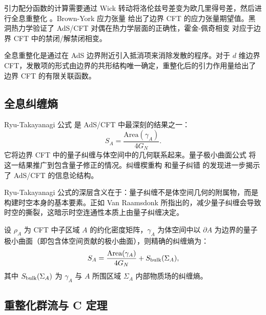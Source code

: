 引力配分函数的计算需要通过 Wick 转动将洛伦兹号差变为欧几里得号差，然后进行全息重整化 \cite{Henningson1998, Balasubramanian1999}。Brown-York 应力张量 \cite{Brown1993} 给出了边界 CFT 的应力张量期望值。黑洞热力学验证了 AdS/CFT 对偶在热力学层面的正确性，霍金-佩奇相变 \cite{Hawking1983} 对应于边界 CFT 中的禁闭/解禁闭相变。

\begin{definition}[全息重整化]
全息重整化是通过在 AdS 边界附近引入抵消项来消除发散的程序。对于 $d$ 维边界 CFT，发散项的形式由边界的共形结构唯一确定，重整化后的引力作用量给出了边界 CFT 的有限关联函数。
\end{definition}

\subsection{全息纠缠熵}

Ryu-Takayanagi 公式 \cite{Ryu2006} 是 AdS/CFT 中最深刻的结果之一：
\begin{equation}
    S_A = \frac{\text{Area}(\gamma_A)}{4G_N}.
\end{equation}
它将边界 CFT 中的量子纠缠与体空间中的几何联系起来。量子极小曲面公式 \cite{Engelhardt2015} 将这一结果推广到包含量子修正的情况。纠缠楔重构 \cite{Dong2016} 和量子纠错 \cite{Almheiri2015, Pastawski2015} 的发现进一步揭示了 AdS/CFT 的信息论结构。

\begin{remark}
Ryu-Takayanagi 公式的深层含义在于：量子纠缠不是体空间几何的附属物，而是构建时空本身的基本要素。正如 Van Raamsdonk \cite{VanRaamsdonk2010} 所指出的，减少量子纠缠会导致时空的撕裂，这暗示时空连通性本质上由量子纠缠决定。
\end{remark}

\begin{theorem}[量子极小曲面]
设 $\rho_A$ 为 CFT 中子区域 $A$ 的约化密度矩阵，$\gamma_A$ 为体空间中以 $\partial A$ 为边界的量子极小曲面（即包含体空间贡献的极小曲面），则精确的纠缠熵为：
\begin{equation}
    S_A = \frac{\text{Area}(\gamma_A)}{4G_N} + S_{\rm bulk}(\Sigma_A),
\end{equation}
其中 $S_{\rm bulk}(\Sigma_A)$ 为 $\gamma_A$ 与 $A$ 所围区域 $\Sigma_A$ 内部物质场的纠缠熵。
\end{theorem}

\subsection{重整化群流与 C 定理}

